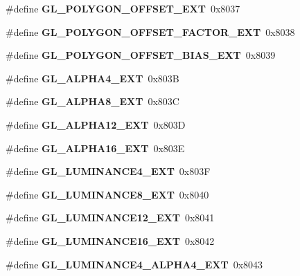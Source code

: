 \begin{DoxyCompactItemize}
\item 
\#define {\bfseries G\+L\+\_\+\+P\+O\+L\+Y\+G\+O\+N\+\_\+\+O\+F\+F\+S\+E\+T\+\_\+\+E\+X\+T}~0x8037\label{_s_d_l__opengl_8h_a2809440f39362c351e31d5ae9127411d}

\item 
\#define {\bfseries G\+L\+\_\+\+P\+O\+L\+Y\+G\+O\+N\+\_\+\+O\+F\+F\+S\+E\+T\+\_\+\+F\+A\+C\+T\+O\+R\+\_\+\+E\+X\+T}~0x8038\label{_s_d_l__opengl_8h_a5b7607079ca197d24699fc14ee8684e3}

\item 
\#define {\bfseries G\+L\+\_\+\+P\+O\+L\+Y\+G\+O\+N\+\_\+\+O\+F\+F\+S\+E\+T\+\_\+\+B\+I\+A\+S\+\_\+\+E\+X\+T}~0x8039\label{_s_d_l__opengl_8h_ac00eb413b15d6b9e5e3233ba123955cd}

\item 
\#define {\bfseries G\+L\+\_\+\+A\+L\+P\+H\+A4\+\_\+\+E\+X\+T}~0x803\+B\label{_s_d_l__opengl_8h_af3ae04a6be7d354084b82492a894bb44}

\item 
\#define {\bfseries G\+L\+\_\+\+A\+L\+P\+H\+A8\+\_\+\+E\+X\+T}~0x803\+C\label{_s_d_l__opengl_8h_a02d722146b3a3e7a89a0bcb486181910}

\item 
\#define {\bfseries G\+L\+\_\+\+A\+L\+P\+H\+A12\+\_\+\+E\+X\+T}~0x803\+D\label{_s_d_l__opengl_8h_a28b78537c062e5bcdf4dfe1bde50b4c6}

\item 
\#define {\bfseries G\+L\+\_\+\+A\+L\+P\+H\+A16\+\_\+\+E\+X\+T}~0x803\+E\label{_s_d_l__opengl_8h_a8c834fe9978d3ae5b8be3034bd16af2f}

\item 
\#define {\bfseries G\+L\+\_\+\+L\+U\+M\+I\+N\+A\+N\+C\+E4\+\_\+\+E\+X\+T}~0x803\+F\label{_s_d_l__opengl_8h_a314dfef7d03af2395ec8053558ba41f0}

\item 
\#define {\bfseries G\+L\+\_\+\+L\+U\+M\+I\+N\+A\+N\+C\+E8\+\_\+\+E\+X\+T}~0x8040\label{_s_d_l__opengl_8h_a23492b23d502f866c1a13cba9ed7e5c2}

\item 
\#define {\bfseries G\+L\+\_\+\+L\+U\+M\+I\+N\+A\+N\+C\+E12\+\_\+\+E\+X\+T}~0x8041\label{_s_d_l__opengl_8h_ac70ed4ed31687cab8164911fb4906ebe}

\item 
\#define {\bfseries G\+L\+\_\+\+L\+U\+M\+I\+N\+A\+N\+C\+E16\+\_\+\+E\+X\+T}~0x8042\label{_s_d_l__opengl_8h_ae8e15458f9517faac4b59f8dcbf81724}

\item 
\#define {\bfseries G\+L\+\_\+\+L\+U\+M\+I\+N\+A\+N\+C\+E4\+\_\+\+A\+L\+P\+H\+A4\+\_\+\+E\+X\+T}~0x8043\label{_s_d_l__opengl_8h_a7a77f6f56910d4a05b8f2a4974c453d7}


\end{DoxyCompactItemize}
